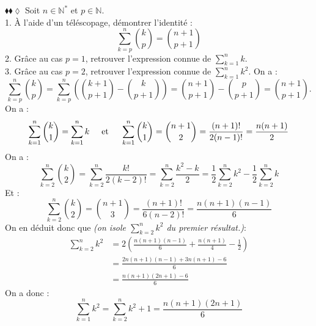 \documentclass[11pt]{article}
\begin{document}
\begin{exercice}{$\blacklozenge\blacklozenge\lozenge$}{}
    Soit $n\in\mathbb{N}^*$ et $p\in\mathbb{N}$.\\
    1. À l'aide d'un téléscopage, démontrer l'identité :
    \begin{equation*}
        \sum\limits^{n}_{k=p}{\binom{k}{p}}=\binom{n+1}{p+1}
    \end{equation*}
    2. Grâce au cas $p=1$, retrouver l'expression connue de $\sum\limits_{k=1}^nk$.\\
    3. Grâce au cas $p=2$, retrouver l'expression connue de $\sum_{k=1}^nk^2$.
    \tcblower
     On a :
    \begin{equation*}
        \sum\limits^{n}_{k=p}\binom{k}{p}=\sum\limits^{n}_{k=p}{\left(\binom{k+1}{p+1}-\binom{k}{p+1}\right)}=\binom{n+1}{p+1}-\binom{p}{p+1}=\binom{n+1}{p+1}.
    \end{equation*}
     On a :
    \begin{equation*}
        \sum\limits^{n}_{k=1}{\binom{k}{1}}=\sum\limits^{n}_{k=1}{k} \hspace{0.5cm} \mathrm{et} \hspace{0.5cm} \sum\limits^{n}_{k=1}{\binom{k}{1}}=\binom{n+1}{2}=\frac{(n+1)!}{2(n-1)!}=\frac{n(n+1)}{2}
    \end{equation*}
     On a :
    \begin{equation*}
        \sum\limits^{n}_{k=2}{\binom{k}{2}}=\sum\limits^{n}_{k=2}{\frac{k!}{2(k-2)!}}=\sum\limits^{n}_{k=2}{\frac{k^2-k}{2}}=\frac{1}{2}\sum\limits^{n}_{k=2}{k^2}-\frac{1}{2}\sum\limits^{n}_{k=2}{k}
    \end{equation*}
    Et :
    \begin{equation*}
        \sum\limits^{n}_{k=2}{\binom{k}{2}}=\binom{n+1}{3}=\frac{(n+1)!}{6(n-2)!}=\frac{n(n+1)(n-1)}{6}
    \end{equation*}
    On en déduit donc que \emph{(on isole $\sum\limits^{n}_{k=2}{k^2}$ du premier résultat.)}:
    \begin{align*}
        \sum\limits^{n}_{k=2}{k^2}&=2\left(\frac{n(n+1)(n-1)}{6}+\frac{n(n+1)}{4}-\frac{1}{2}\right)\\
        &=\frac{2n(n+1)(n-1)+3n(n+1)-6}{6}\\
        &=\frac{n(n+1)(2n+1)-6}{6}
    \end{align*}
    On a donc :
    \begin{equation*}
        \sum\limits^{n}_{k=1}{k^2}=\sum\limits^{n}_{k=2}{k^2}+1=\frac{n(n+1)(2n+1)}{6}
    \end{equation*}
\end{exercice}
\end{document}

